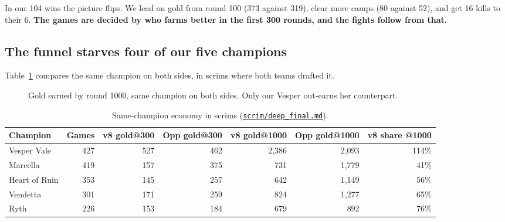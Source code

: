 \documentclass[11pt,a4paper]{article}
\newcommand{\data}{file:///Users/tristanbasri/Desktop/Code/battlecode-scrim-2026-10-25}
\newcommand{\src}[2]{{\small(\href{#1}{\textcolor{cTop}{\texttt{#2}}})}}
\begin{document}
In our 104 wins the picture flips. We lead on gold from round 100 (373 against 319), clear more camps (80 against 52), and get 16 kills to their 6. \textbf{The games are decided by who farms better in the first 300 rounds, and the fights follow from that.}

\subsection{The funnel starves four of our five champions}

Table~\ref{tab:samechamp} compares the same champion on both sides, in scrims where both teams drafted it.

\begin{figure}[H]
\centering
{}
\caption{Gold earned by round 1000, same champion on both sides. Only our Vesper out-earns her counterpart.}
\label{fig:samechamp}
\end{figure}

\begin{table}[H]
\centering\footnotesize\setlength{\tabcolsep}{5pt}
\begin{tabular}{lrrrrrr}
\toprule
Champion & Games & v8 gold@300 & Opp gold@300 & v8 gold@1000 & Opp gold@1000 & v8 share @1000 \\
\midrule
Vesper Vale   & 427 & 527 & 462 & 2,386 & 2,093 & \textcolor{cGood}{114\%} \\
Marcella      & 419 & 157 & 375 & 731   & 1,779 & \textcolor{cBad}{41\%} \\
Heart of Ruin & 353 & 145 & 257 & 642   & 1,149 & \textcolor{cBad}{56\%} \\
Vendetta      & 301 & 171 & 259 & 824   & 1,277 & \textcolor{cBad}{65\%} \\
Ryth          & 226 & 153 & 184 & 679   & 892   & 76\% \\
\bottomrule
\end{tabular}
\caption{Same-champion economy in scrims \src{\data/scrim/deep\_final.md}{scrim/deep\_final.md}.}
\label{tab:samechamp}
\end{table}
\end{document}
